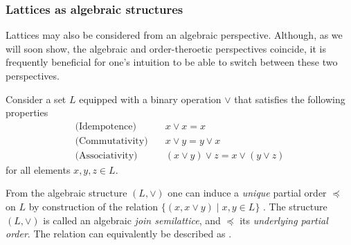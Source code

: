 \subsubsection{Lattices as algebraic structures}
\label{subsubsection:lattices-as-algebraic-structures}

Lattices may also be considered from an algebraic perspective. Although, as we will soon show, the algebraic and order-theroetic
perspectives coincide, it is frequently beneficial for one's intuition to be able to switch between these two perspectives.

Consider a set $L$ equipped with a binary operation $\vee$ that satisfies the following properties
%
\begin{align}
	\text{(Idempotence)}   & \quad x \vee x = x \label{eq:idempotence}                            \\
	\text{(Commutativity)} & \quad x \vee y = y \vee x \label{eq:commutativity}                   \\
	\text{(Associativity)} & \quad (x \vee y) \vee z = x \vee (y \vee z) \label{eq:associativity}
\end{align}
for all elements $x,y,z \in L$.

From the algebraic structure $(L, \vee)$ one can induce a \textit{unique} partial order $\preceq$ on $L$ by construction
of the relation $\{( x, x \vee y) \mid x,y \in L \}$ \cite{bergman2015invitation}. The structure $(L, \vee)$ is called an
algebraic \textit{join semilattice}, and $\preceq$ its \textit{underlying partial order}. The relation can equivalently be
described as .

